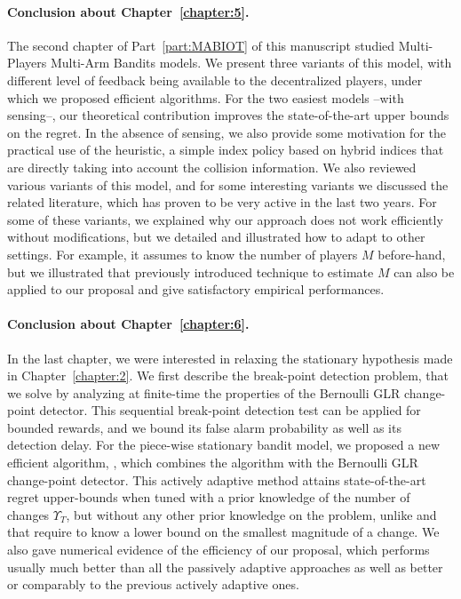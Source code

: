 \paragraph{Conclusion about \textbf{Chapter~\ref{chapter:5}}.}

The second chapter of Part~\ref{part:MABIOT} of this manuscript studied Multi-Players Multi-Arm Bandits models.
%
We present three variants of this model,
with different level of feedback being available to the decentralized players, under which we proposed efficient algorithms.
For the two easiest models --with sensing--, our theoretical contribution improves the state-of-the-art upper bounds on the regret. In the absence of sensing, we also provide some motivation for the practical use of the \Selfish{} heuristic, a simple index policy based on hybrid indices that are directly taking  into account the collision information.
%
We also reviewed various variants of this model, and for some interesting variants we discussed the related literature, which has proven to be very active in the last two years.
For some of these variants, we explained why our approach does not work efficiently without modifications, but we detailed and illustrated how to adapt \MCTopM{} to other settings.
For example, it assumes to know the number of players $M$ before-hand, but we illustrated that previously introduced technique to estimate $M$ can also be applied to our proposal and give satisfactory empirical performances.


\paragraph{Conclusion about \textbf{Chapter~\ref{chapter:6}}.}

In the last chapter, we were interested in relaxing the stationary hypothesis made in Chapter~\ref{chapter:2}.
%
We first describe the break-point detection problem, that we solve by analyzing at finite-time the properties of the Bernoulli GLR change-point detector. This sequential break-point detection test can be applied for bounded rewards, and we bound its false alarm probability as well as its detection delay.
For the piece-wise stationary bandit model,
we proposed a new efficient algorithm, \GLRklUCB, which combines the \klUCB{} algorithm with the Bernoulli GLR change-point detector.
This actively adaptive method attains state-of-the-art regret upper-bounds when tuned with a prior knowledge of the number of changes $\Upsilon_T$, but without any other prior knowledge on the problem, unlike \CUSUMUCB{} and \MUCB{} that require to know a lower bound on the smallest magnitude of a change.
We also gave numerical evidence of the efficiency of our proposal, which performs usually much better than all the passively adaptive approaches as well as better or comparably to the previous actively adaptive ones.


